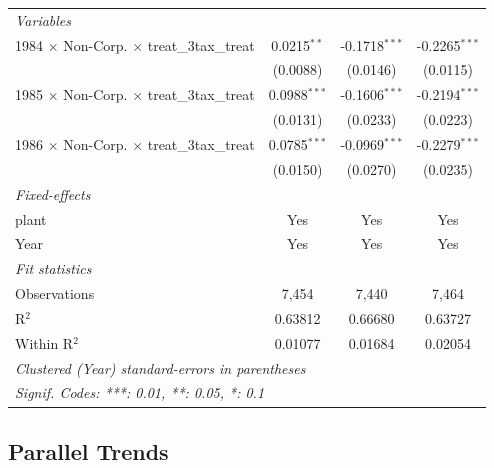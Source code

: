 \documentclass[
  12pt]{article}
\theoremstyle{definition}
\theoremstyle{remark}
\begin{document}
\begin{table}
\begin{minipage}{\linewidth}
\begin{tabular}{lccc}
   \midrule
   \emph{Variables}\\
   1984 $\times$ Non-Corp. $\times$ treat\_3tax\_treat     & 0.0215$^{**}$  & -0.1718$^{***}$ & -0.2265$^{***}$\\   
                                                           & (0.0088)       & (0.0146)        & (0.0115)\\   
   1985 $\times$ Non-Corp. $\times$ treat\_3tax\_treat     & 0.0988$^{***}$ & -0.1606$^{***}$ & -0.2194$^{***}$\\   
                                                           & (0.0131)       & (0.0233)        & (0.0223)\\   
   1986 $\times$ Non-Corp. $\times$ treat\_3tax\_treat     & 0.0785$^{***}$ & -0.0969$^{***}$ & -0.2279$^{***}$\\   
                                                           & (0.0150)       & (0.0270)        & (0.0235)\\   
   \midrule
   \emph{Fixed-effects}\\
   plant                                                   & Yes            & Yes             & Yes\\  
   Year                                                    & Yes            & Yes             & Yes\\  
   \midrule
   \emph{Fit statistics}\\
   Observations                                            & 7,454          & 7,440           & 7,464\\  
   R$^2$                                                   & 0.63812        & 0.66680         & 0.63727\\  
   Within R$^2$                                            & 0.01077        & 0.01684         & 0.02054\\  
   \midrule \midrule
   \multicolumn{4}{l}{\emph{Clustered (Year) standard-errors in parentheses}}\\
   \multicolumn{4}{l}{\emph{Signif. Codes: ***: 0.01, **: 0.05, *: 0.1}}\\
\end{tabular}
\par\endgroup

\end{minipage}%

\end{table}%

\subsection{Parallel Trends}\label{parallel-trends}
\end{document}
